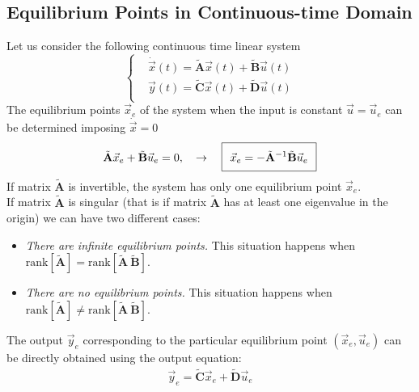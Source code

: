 \documentclass[11pt,a4paper,oneside]{book}
\numberwithin{equation}{section}
\theoremstyle{it}
\theoremstyle{definition}
\begin{document}
\subsection{Equilibrium Points in Continuous-time Domain} 
Let us consider the following continuous time linear system
\begin{equation}\label{eq068}
	\left\lbrace 
	\begin{aligned}
		& \dot{\vec{x}}(t) = \tilde{\mathbf{A}}\vec{x}(t) 
		+\tilde{\mathbf{B}}\vec{u}(t) \\[6pt]
		&  \vec{y}(t) = \tilde{\mathbf{C}} \vec{x}(t) + 
		\tilde{\mathbf{D}}\vec{u}(t)\\[6pt]
	\end{aligned}
	\right. 
\end{equation}
The equilibrium points $\vec{x}_e$ of the system when the input is constant 
$\vec{u} = \vec{u}_e$ can be determined imposing $\dot{\vec{x}}=0$
\begin{equation}\label{eq70} 
	\setlength\fboxsep{0.25cm}
	\setlength\fboxrule{0.4pt}
	\begin{aligned}
		\tilde{\mathbf{A}}\vec{x}_e + \tilde{\mathbf{B}}\vec{u}_e = 0, \quad 
		\rightarrow \quad
		\boxed{ \vec{x}_e=-\tilde{\mathbf{A}}^{-1}\tilde{\mathbf{B}}\vec{u}_e }
	\end{aligned}
\end{equation}
If matrix $\tilde{\mathbf{A}}$ is invertible, the system has only one 
equilibrium point $\vec{x}_e$.\\
If matrix $\tilde{\mathbf{A}}$ is singular (that is if matrix 
$\tilde{\mathbf{A}}$ has at least one eigenvalue in the origin) we can have two 
different cases:
\begin{itemize}
	\item \textit{There are infinite equilibrium points.} This situation 
	happens when $\text{rank}\left[\tilde{\mathbf{A}}\right] = 
	\text{rank}\left[ \tilde{\mathbf{A}} \ \tilde{\mathbf{B}}\right]$. 
	\item \textit{There are no equilibrium points.} This situation happens when 
	$\text{rank}\left[\tilde{\mathbf{A}}\right] \ne \text{rank}\left[ 
	\tilde{\mathbf{A}} \ \tilde{\mathbf{B}}\right]$. 
\end{itemize}
The output $\vec{y}_e$ corresponding to the particular equilibrium point 
$\left( \vec{x}_e, \vec{u}_e \right) $ can be directly obtained using the 
output equation:
\begin{equation}\label{eq71}
	\begin{aligned}
		\vec{y}_e = \tilde{\mathbf{C}}\vec{x}_e+\tilde{\mathbf{D}}\vec{u}_e
	\end{aligned}
\end{equation}
\end{document}
